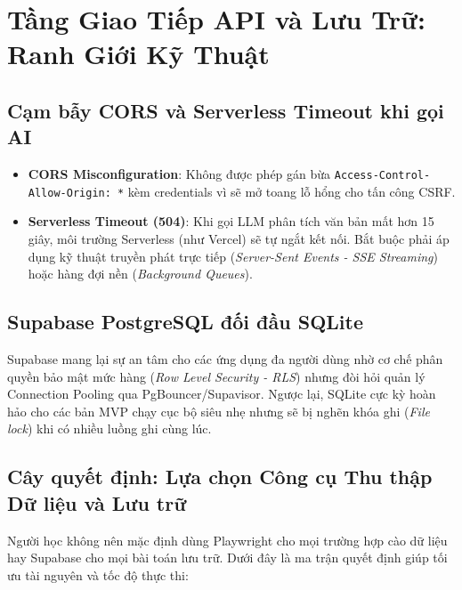 \documentclass[a4paper,11pt]{article}
\begin{document}
\section{Tầng Giao Tiếp API và Lưu Trữ: Ranh Giới Kỹ Thuật}

\subsection{Cạm bẫy CORS và Serverless Timeout khi gọi AI}
\begin{itemize}[leftmargin=1.5em]
    \item \textbf{CORS Misconfiguration}: Không được phép gán bừa \texttt{Access-Control-Allow-Origin: *} kèm credentials vì sẽ mở toang lỗ hổng cho tấn công CSRF.
    \item \textbf{Serverless Timeout (504)}: Khi gọi LLM phân tích văn bản mất hơn 15 giây, môi trường Serverless (như Vercel) sẽ tự ngắt kết nối. Bắt buộc phải áp dụng kỹ thuật truyền phát trực tiếp (\textit{Server-Sent Events - SSE Streaming}) hoặc hàng đợi nền (\textit{Background Queues}).
\end{itemize}

\subsection{Supabase PostgreSQL đối đầu SQLite}
Supabase mang lại sự an tâm cho các ứng dụng đa người dùng nhờ cơ chế phân quyền bảo mật mức hàng (\textit{Row Level Security - RLS}) nhưng đòi hỏi quản lý Connection Pooling qua PgBouncer/Supavisor. Ngược lại, SQLite cực kỳ hoàn hảo cho các bản MVP chạy cục bộ siêu nhẹ nhưng sẽ bị nghẽn khóa ghi (\textit{File lock}) khi có nhiều luồng ghi cùng lúc.

\subsection{Cây quyết định: Lựa chọn Công cụ Thu thập Dữ liệu và Lưu trữ}

Người học không nên mặc định dùng Playwright cho mọi trường hợp cào dữ liệu hay Supabase cho mọi bài toán lưu trữ. Dưới đây là ma trận quyết định giúp tối ưu tài nguyên và tốc độ thực thi:
\end{document}
